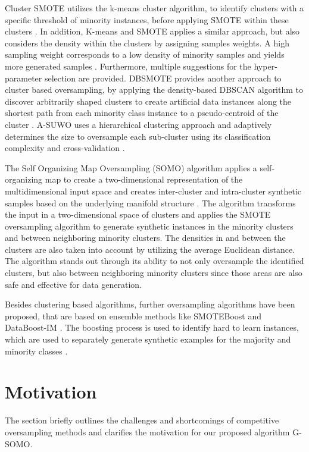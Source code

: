 \documentclass[parskip=full]{scrartcl}
\begin{document}
Cluster SMOTE utilizes the k-means cluster algorithm, to identify clusters with
a specific threshold of minority instances, before applying SMOTE within these
clusters \cite{Cieslak2006}. In addition, K-means and SMOTE applies a similar
approach, but also considers the density within the clusters by assigning
samples weights. A high sampling weight corresponds to a low density of minority
samples and yields more generated samples \cite{Douzas2018}. Furthermore, multiple
suggestions for the hyper-parameter selection are provided. DBSMOTE provides
another approach to cluster based oversampling, by applying the density-based
DBSCAN algorithm to discover arbitrarily shaped clusters to create artificial
data instances along the shortest path from each minority class instance to a
pseudo-centroid of the cluster \cite{Bunkhumpornpat2012}. A-SUWO uses a
hierarchical clustering approach and adaptively determines the size to
oversample each sub-cluster using its classification complexity and
cross-validation \cite{Nekooeimehr2016}. 

The Self Organizing Map Oversampling (SOMO) algorithm applies a self-organizing
map to create a two-dimensional representation of the multidimensional input
space and creates inter-cluster and intra-cluster synthetic samples based on the
underlying manifold structure \cite{Douzas2017}. The algorithm transforms the
input in a two-dimensional space of clusters and applies the SMOTE oversampling
algorithm to generate synthetic instances in the minority clusters and between
neighboring minority clusters. The densities in and between the clusters are
also taken into account by utilizing the average Euclidean distance. The
algorithm stands out through its ability to not only oversample the identified
clusters, but also between neighboring minority clusters since those areas are
also safe and effective for data generation.  

Besides clustering based algorithms, further oversampling algorithms have been
proposed, that are based on ensemble methods like SMOTEBoost \cite{Chawla2003}
and DataBoost-IM \cite{Guo2004}. The boosting process is used to identify hard
to learn instances, which are used to separately generate synthetic examples for
the majority and minority classes  \cite{Guo2004}.

\section{Motivation}

The section briefly outlines the challenges and shortcomings of competitive
oversampling methods and clarifies the motivation for our proposed algorithm
G-SOMO.
\end{document}
